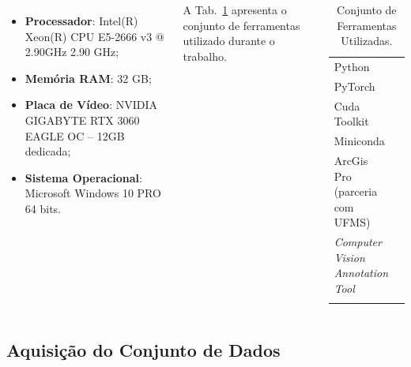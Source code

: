 \documentclass[%
  10pt,%
  aspectratio = 169,%
  compress,%
  t,%
  english,%
  brazilian,%
  tikz,
]{beamer}
\begin{document}
\begin{frame}
\begin{columns}[T]
\begin{itemize}
    \item \textbf{Processador}: Intel(R) Xeon(R) CPU E5-2666 v3 @ 2.90GHz 2.90 GHz;
    \item \textbf{Memória RAM}: 32 GB;
    \item \textbf{Placa de Vídeo}: NVIDIA GIGABYTE RTX 3060 EAGLE OC – 12GB dedicada;
    \item \textbf{Sistema Operacional}: Microsoft Windows 10 PRO 64 bits.
\end{itemize}

A Tab.~\ref{tab:tools} apresenta o conjunto de ferramentas utilizado durante o trabalho.
\begin{table}[!htb]
\centering%
\caption{Conjunto de Ferramentas Utilizadas.}%
\label{tab:tools}
\begin{tabular*}{\columnwidth}{@{\extracolsep{\fill}}ll}
\toprule
Python                                   & \cite{PythonManual}           \\
PyTorch                                  & \cite{pytorch}                \\
Cuda Toolkit                             & \cite{NvidiaCuda}                \\
Miniconda                                & \cite{Miniconda}                \\
ArcGis Pro (parceria com UFMS)           & \cite{Arcgis}                \\
\textit{Computer Vision Annotation Tool} & \cite{cvat}                \\
\bottomrule
\addlinespace
\end{tabular*}
\end{table}

\end{columns}
\end{frame}

\subsection{Aquisição do Conjunto de Dados}\label{ssec:matmet4}
\end{document}
